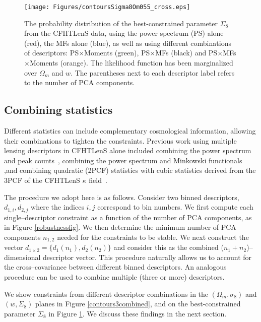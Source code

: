 \documentclass[reprint,aps,prd,superscriptaddress,showkeys,showpacs]{revtex4-1}
\begin{document}
\begin{figure}
\begin{center}
\texttt{[image: Figures/contoursSigma8Om055\_cross.eps]}
\end{center}
\caption{The probability distribution of the best-constrained
  parameter $\Sigma_8$ from the CFHTLenS data, using the power
  spectrum (PS) alone (red), the MFs alone (blue), as well as using
  different combinations of descriptors: PS$\times$Moments (green),
  PS$\times$MFs (black) and PS$\times$MFs$\times$Moments (orange).
  The likelihood function has been marginalized over $\Omega_m$ and
  $w$. The parentheses next to each descriptor label refers to the
  number of PCA components.}
\label{likelihoodSi8cross}
\end{figure}

\subsection{Combining statistics}

Different statistics can include complementary cosmological
information, allowing their combinations to tighten the
constraints. Previous work using multiple lensing descriptors in
CFHTLenS alone included combining the power spectrum and peak
counts~\citep{Companion}, combining the power spectrum and Minkowski functionals ~\citep{CFHTMasato} ,and combining quadratic (2PCF) statistics
with cubic statistics derived from the 3PCF of the CFHTLenS $\kappa$ field~\citep{CFHTFu}.

The procedure we adopt here is as follows. Consider two binned
descriptors, $d_{1,i},d_{2,j}$ where the indices $i,j$ correspond to
bin numbers.  We first compute each single--descriptor constraint as a
function of the number of PCA components, as in Figure
\ref{robustnessfig}. We then determine the minimum number of PCA
components $n_{1,2}$ needed for the constraints to be stable. We next
construct the vector $d_{1\times2} = \{d_1(n_1),d_2(n_2)\}$ and
consider this as the combined ($n_1+n_2$)--dimensional descriptor
vector. This procedure naturally allows us to account for the
cross--covariance between different binned descriptors. An analogous
procedure can be used to combine multiple (three or more)
descriptors. 


We show constraints from different descriptor combinations in the
$(\Omega_m,\sigma_8)$ and $(w,\Sigma_8)$ planes in Figure
\ref{contours3combined}, and on the best-constrained parameter
$\Sigma_8$ in Figure \ref{likelihoodSi8cross}. We discuss these
findings in the next section.
\end{document}
